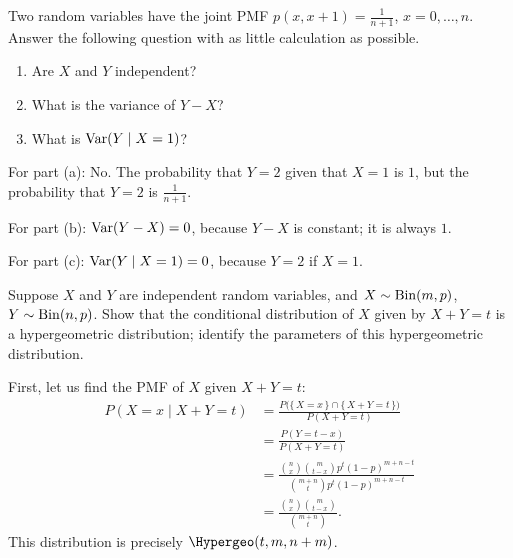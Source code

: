 \begin{problem}[Handout 15, \# 13]
  Two random variables have the joint PMF \(p(x,x+1)=\frac{1}{n+1}\),
  \(x=0,\dotsc,n\). Answer the following question with as little
  calculation as possible.
  \begin{enumerate}[label=(\alph*),noitemsep]
  \item Are \(X\) and \(Y\) independent?
  \item What is the variance of \(Y-X\)?
  \item What is \(\operatorname{Var}(Y\mid {X=1})\)?
  \end{enumerate}
\end{problem}
\begin{solution}
  For part (a): No. The probability that $Y=2$ given that $X=1$ is $1$, but
  the probability that $Y=2$ is $\frac{1}{n+1}$.

  For part (b): $\operatorname{Var}(Y-X) = 0$, because $Y-X$ is constant; it is
  always $1$.

  For part (c): $\operatorname{Var}(Y\mid X=1) = 0$, because $Y = 2$ if $X=1$.
\end{solution}

\begin{problem}
  Suppose \(X\) and \(Y\) are independent random variables, and
  \(X\sim\operatorname{Bin}(m,p)\), \(Y\sim\operatorname{Bin}(n,p)\). Show that the conditional
  distribution of \(X\) given by \(X+Y=t\) is a hypergeometric
  distribution; identify the parameters of this hypergeometric
  distribution.
\end{problem}
\begin{solution}
  First, let us find the PMF of \(X\) given \(X+Y=t\):
  \begin{align*}
    P(X=x\mid X+Y=t)
    &=\frac{P\bigl(\{\,X=x\,\}\cap\{\,X+Y=t\,\}\bigr)}{P(X+Y=t)}\\
    &=\frac{P(Y=t-x)}{P(X+Y=t)}\\
    &=\frac{\binom{n}{x}\binom{m}{t-x}p^t(1-p)^{m+n-t}}
      {\binom{m+n}{t}p^t(1-p)^{m+n-t}}\\
    &=\frac{\binom{n}{x}\binom{m}{t-x}}{\binom{m+n}{t}}.
  \end{align*}
  This distribution is precisely \(\Hypergeo(t,m,n+m)\).
\end{solution}

